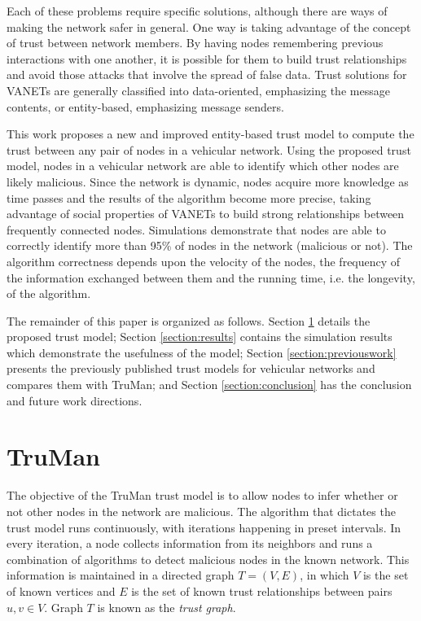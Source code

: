 \documentclass[conference]{IEEEtran}
\begin{document}
Each of these problems require specific solutions, although there are ways of making the network safer in general.
One way is taking advantage of the concept of trust between network members.
By having nodes remembering previous interactions with one another, it is possible for them to build trust relationships and avoid those attacks that involve the spread of false data.
Trust solutions for VANETs are generally classified into data-oriented, emphasizing the message contents, or entity-based, emphasizing message senders.

This work proposes a new and improved entity-based trust model to compute the trust between any pair of nodes in a vehicular network.
Using the proposed trust model, nodes in a vehicular network are able to identify which other nodes are likely malicious.
Since the network is dynamic, nodes acquire more knowledge as time passes and the results of the algorithm become more precise, taking advantage of social properties of VANETs \cite{da2013effective} \cite{cunha2014possible} to build strong relationships between frequently connected nodes.
Simulations demonstrate that nodes are able to correctly identify more than 95\% of nodes in the network (malicious or not).
The algorithm correctness depends upon the velocity of the nodes, the frequency of the information exchanged between them and the running time, i.e. the longevity, of the algorithm.


The remainder of this paper is organized as follows.
Section \ref{section:algorithm} details the proposed trust model;
Section \ref{section:results} contains the simulation results which demonstrate the usefulness of the model;
Section \ref{section:previouswork} presents the previously published trust models for vehicular networks and compares them with TruMan;
and Section \ref{section:conclusion} has the conclusion and future work directions.

\section{TruMan}
\label{section:algorithm}


The objective of the TruMan trust model is to allow nodes to infer whether or not other nodes in the network are malicious.
The algorithm that dictates the trust model runs continuously, with iterations happening in preset intervals.
In every iteration, a node collects information from its neighbors and runs a combination of algorithms to detect malicious nodes in the known network.
This information is maintained in a directed graph $T=(V,E)$, in which $V$ is the set of known vertices and $E$ is the set of known trust relationships between pairs $u,v \in V$.
Graph $T$ is known as the \textit{trust graph}.
\end{document}
